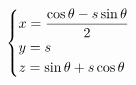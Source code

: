 \documentclass[preview]{standalone}
\begin{document}
\begin{align*}
\special{dvisvgm:raw <g id='unique000'>}\begin{cases}x=\dfrac{\cos\theta-s\sin\theta}{2}\\y=s\\z=\sin\theta+s\cos\theta\end{cases}\special{dvisvgm:raw </g>}
\end{align*}
\end{document}
